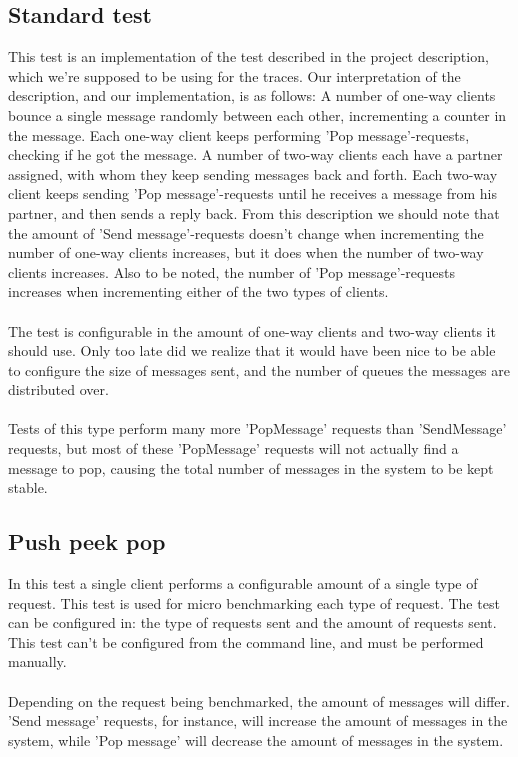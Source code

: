 \documentclass{article}
\begin{document}
        \subsection{Standard test}
            \label{sec:standard_test}
            This test is an implementation of the test described in the project description, which we're supposed to be using for the traces. Our interpretation of the description, and our implementation, is as follows: A number of one-way clients bounce a single message randomly between each other, incrementing a counter in the message. Each one-way client keeps performing 'Pop message'-requests, checking if he got the message. A number of two-way clients each have a partner assigned, with whom they keep sending messages back and forth. Each two-way client keeps sending 'Pop message'-requests until he receives a message from his partner, and then sends a reply back. From this description we should note that the amount of 'Send message'-requests doesn't change when incrementing the number of one-way clients increases, but it does when the number of two-way clients increases. Also to be noted, the number of 'Pop message'-requests increases when incrementing either of the two types of clients.\\
            \\
            The test is configurable in the amount of one-way clients and two-way clients it should use. Only too late did we realize that it would have been nice to be able to configure the size of messages sent, and the number of queues the messages are distributed over.\\
            \\
            Tests of this type perform many more 'PopMessage' requests than 'SendMessage' requests, but most of these 'PopMessage' requests will not actually find a message to pop, causing the total number of messages in the system to be kept stable.

        \subsection{Push peek pop}
            In this test a single client performs a configurable amount of a single type of request. This test is used for micro benchmarking each type of request.
            The test can be configured in: the type of requests sent and the amount of requests sent. This test can't be configured from the command line, and must be performed manually.\\
            \\
            Depending on the request being benchmarked, the amount of messages will differ. 'Send message' requests, for instance, will increase the amount of messages in the system, while 'Pop message' will decrease the amount of messages in the system.
\end{document}
